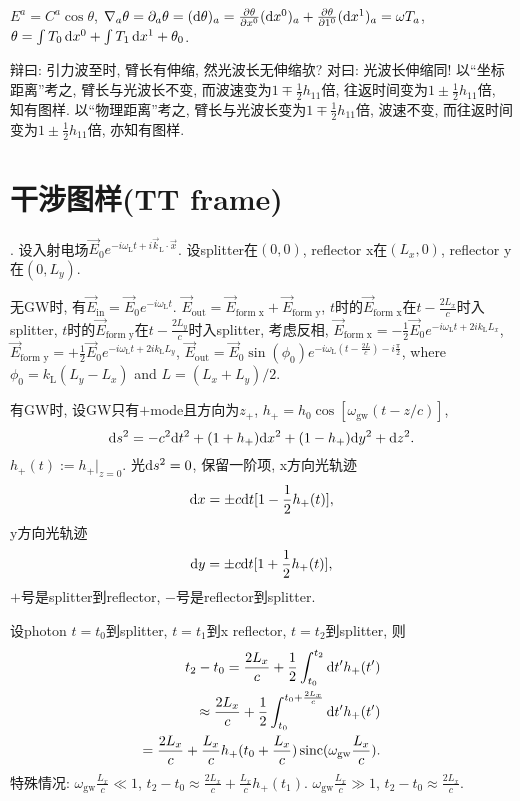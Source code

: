$E^a=C^a\cos\theta$, $\nabla_a\theta=\partial_a\theta=(\mathrm{d}\theta)_a=\frac{\partial\theta}{\partial x^0}(\mathrm{d} x^0)_a+\frac{\partial\theta}{\partial 1^0}(\mathrm{d} x^1)_a=\omega T_a$, $\theta=\int T_0\,\mathrm{d} x^0+\int T_1\,\mathrm{d} x^1+\theta_0$.

辩曰: 引力波至时, 臂长有伸缩, 然光波长无伸缩欤? 对曰: 光波长伸缩同! 以``坐标距离''考之, 臂长与光波长不变, 而波速变为$1\mp\frac{1}{2}h_{11}$倍, 往返时间变为$1\pm\frac{1}{2}h_{11}$倍, 知有图样. 以``物理距离''考之, 臂长与光波长变为$1\mp\frac{1}{2}h_{11}$倍, 波速不变, 而往返时间变为$1\pm\frac{1}{2}h_{11}$倍, 亦知有图样.

\section{干涉图样(TT frame)}\label{TT_explanation}

\cite{Maggiore2014}. 设入射电场$\vec{E}_0e^{-i\omega_\text{L}t+i\vec{k}_\text{L}\cdot\vec{x}}$. 设splitter在$(0,0)$, reflector x在$(L_x,0)$, reflector y在$(0,L_y)$.

无GW时, 有$\vec{E}_\text{in}=\vec{E}_0e^{-i\omega_\text{L}t}$. $\vec{E}_\text{out}=\vec{E}_\text{form x}+\vec{E}_\text{form y}$, $t$时的$\vec{E}_\text{form x}$在$t-\frac{2L_x}{c}$时入splitter, $t$时的$\vec{E}_\text{form y}$在$t-\frac{2L_y}{c}$时入splitter, 考虑反相, $\vec{E}_\text{form x}=-\frac{1}{2}\vec{E}_0e^{-i\omega_\text{L}t+2ik_\text{L}L_x}$, $\vec{E}_\text{form y}=+\frac{1}{2}\vec{E}_0e^{-i\omega_\text{L}t+2ik_\text{L}L_y}$, $\vec{E}_\text{out}=\vec{E}_0\sin(\phi_0)e^{-i\omega_\text{L}(t-\frac{2L}{c})-i\frac{\pi}{2}}$, where $\phi_0=k_\text{L}(L_y-L_x)$ and $L=(L_x+L_y)/2$.

有GW时, 设GW只有$+$mode且方向为$z_+$, $h_+=h_0\cos[\omega_\text{gw}(t-z/c)]$, 
\begin{equation}
    \mathrm{d} s^2=-c^2\mathrm{d} t^2+(1 +h_+)\mathrm{d} x^2+ (1-h_+)\mathrm{d} y^2+\mathrm{d} z^2.
\end{equation}
$h_+(t):=h_+|_{z=0}$. 光$\mathrm{d} s^2=0$, 保留一阶项, x方向光轨迹
\begin{equation}
    \mathrm{d} x=\pm c\mathrm{d} t[1-\frac{1}{2}h_+(t)],
\end{equation}
y方向光轨迹
\begin{equation}
    \mathrm{d} y=\pm c\mathrm{d} t[1+\frac{1}{2}h_+(t)],
\end{equation}
$+$号是splitter到reflector, $-$号是reflector到splitter. 

设photon $t=t_0$到splitter, $t=t_1$到x reflector, $t=t_2$到splitter, 则
\begin{eqnarray}
    t_2-t_0=\frac{2L_x}{c}+\frac{1}{2}\int^{t_2}_{t_0}\mathrm{d} t'h_+(t')\\
    \approx\frac{2L_x}{c}+\frac{1}{2}\int^{t_0+\frac{2L_x}{c}}_{t_0}\mathrm{d} t'h_+(t')\\
    =\frac{2L_x}{c}+\frac{L_x}{c}h_+(t_0+\frac{L_x}{c})\operatorname{sinc}(\omega_\text{gw}\frac{L_x}{c}).
\end{eqnarray}
特殊情况: $\omega_\text{gw}\frac{L_x}{c}\ll1$, $t_2-t_0\approx\frac{2L_x}{c}+\frac{L_x}{c}h_+(t_1)$. $\omega_\text{gw}\frac{L_x}{c}\gg1$, $t_2-t_0\approx\frac{2L_x}{c}$.

